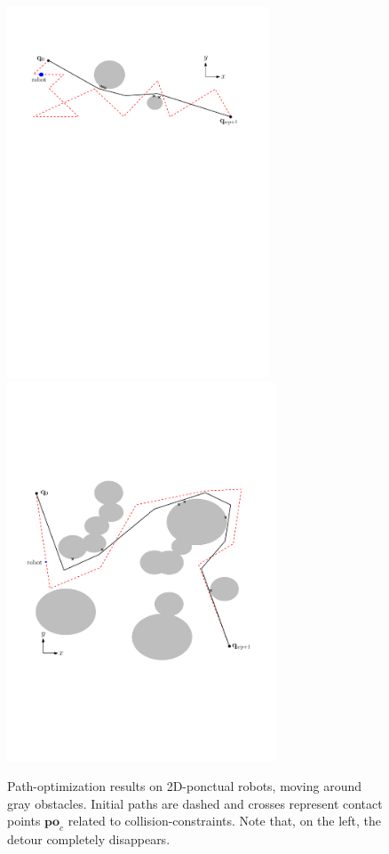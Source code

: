 \documentclass{tADR2e}
\newcommand\po{\mathbf{po}}
\begin{document}
\begin{figure}
	\centering
	\includegraphics[width=7.8cm]{contact_points6.pdf}
	\includegraphics[width=8cm]{contact_points2potential.pdf}
	\caption{Path-optimization results on 2D-ponctual robots, moving around 
	gray obstacles. Initial paths are dashed and crosses represent contact points 
	$\po_c$ related to collision-constraints. Note that, on the left, the detour 
	completely disappears.}
	\label{2D_long}
\end{figure}
\end{document}
